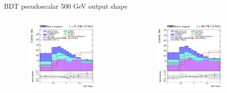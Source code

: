 \documentclass[8pt]{beamer}
\begin{document}
\begin{frame}{BDT pseudoscalar 500 GeV output shape}
\begin{columns}
\begin{column}{0.33\textwidth}
\begin{center}
     			\includegraphics[width=1.0\textwidth, height=100pt]{figs/2017/SmearSR-ttDM-pseudo500/log_cratio_topCR_ll_ST_BDT_output_pseudoscalar500_customBinsAttempt7.png}
    		\end{center}		
		\end{column} 
		\begin{column}{0.33\textwidth}
			\begin{center}
			\begin{block}{}\end{block}	
     			\includegraphics[width=1.0\textwidth, height=100pt]{figs/2018/SmearSR-ttDM-pseudo500/log_cratio_topCR_ll_ST_BDT_output_pseudoscalar500_customBinsAttempt7.png}
    		\end{center}		
		\end{column}
\end{columns}


\end{frame}
\end{document}
